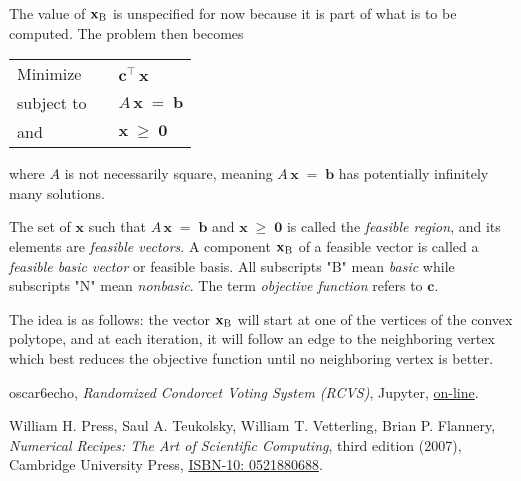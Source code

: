 \documentclass{report}
\theoremstyle{definition}
\theoremstyle{plain}
\begin{document}
The value of $\mathbf x_{\rm B}$ is unspecified for now because it is part of
what is to be computed. The problem then becomes
\begin{center}
	\begin{tabular}{|lll|}
		\hline
		Minimize & & $\mathbf c^\top\,\mathbf x$ \\
		subject to & & $A\,\mathbf x\;=\;\mathbf b$ \\
		and & & $\mathbf x\;\geqslant\;\mathbf 0$ \\
		\hline
	\end{tabular}
\end{center}
where $A$ is not necessarily square, meaning $A\,\mathbf x\;=\;\mathbf b$ has
potentially infinitely many solutions.

The set of $\mathbf x$ such that $A\,\mathbf x\;=\;\mathbf b$ and $\mathbf
x\;\geqslant\;\mathbf 0$ is called the \emph{feasible region}, and its elements
are \emph{feasible vectors}. A component $\mathbf x_{\rm B}$ of a feasible
vector is called a \emph{feasible basic vector} or feasible basis. All
subscripts "B" mean \emph{basic} while subscripts "N" mean \emph{nonbasic}. The
term \emph{objective function} refers to $\mathbf c$.

The idea is as follows: the vector $\mathbf x_{\rm B}$ will start at one of the
vertices of the convex polytope, and at each iteration, it will follow an edge
to the neighboring vertex which best reduces the objective function until no
neighboring vertex is better.

\begin{thebibliography}{9}
	oscar6echo,
	\textit{Randomized Condorcet Voting System (RCVS)},
	Jupyter,
	\href{https://nbviewer.jupyter.org/github/oscar6echo/randomized-condorcet-voting-system/blob/master/Randomized-Condorcet-Voting-System.ipynb}{on-line}.

	William H. Press, Saul A. Teukolsky,
	William T. Vetterling, Brian P. Flannery,
	\textit{Numerical Recipes: The Art of Scientific Computing},
	third edition (2007),
	Cambridge University Press,
	\href{http://numerical.recipes/aboutNR3book.html}{ISBN-10: 0521880688}.
\end{thebibliography}
\end{document}
